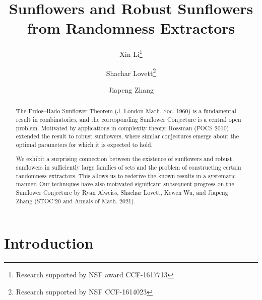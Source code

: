 \documentclass{toc}
\begin{document}
\begin{frontmatter}
%
\title{Sunflowers and Robust Sunflowers from Randomness
    Extractors}

%
%
%
%
%
%
%
%
%
%
%
%
%
%
%
%


%
%
%
\author[Li]{Xin Li\thanks{Research supported by NSF award CCF-1617713}}
\author[Lovett]{Shachar Lovett\thanks{Research supported by NSF CCF-1614023}}
\author[Zhang]{Jiapeng Zhang}%

%
%
%
%

%
\begin{abstract}
The Erd\H{o}s--Rado Sunflower Theorem %
(J. London Math. Soc. 1960) is a fundamental result in combinatorics, and the corresponding Sunflower Conjecture %
is a central open problem. Motivated by applications in complexity theory, Rossman (FOCS 2010) extended the result to robust sunflowers, where similar conjectures emerge about the optimal parameters for which it %
is expected to hold.  %
%

%
We exhibit a surprising connection between the existence of sunflowers
and robust sunflowers in %
%
sufficiently large families of sets %
and the problem of constructing certain randomness extractors.
This allows us to rederive 
the known results in a systematic manner.
%
%
Our techniques have also motivated
%
significant subsequent progress on the Sunflower Conjecture
by Ryan Alweiss, Shachar Lovett, Kewen Wu, and
Jiapeng Zhang (STOC'20 and Annals of Math. 2021).
\end{abstract}


%
%
%
%
%
%
%
%
%
%
%
%
%
%
%
%
%
%
%
%
%
%
%
%
%
%
%
%
%


%
%
%
%
%
%
%
%
%
%

%

\end{frontmatter}

\section{Introduction} \label{sec:intro}
\end{document}
